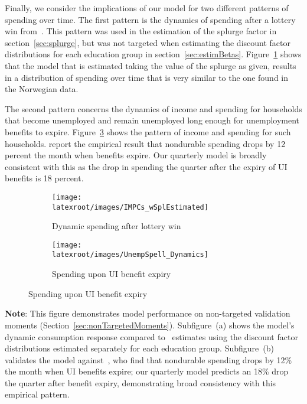 \documentclass[qe]{econsocart}
\begin{document}
Finally, we consider the implications of our model for two different patterns of spending over time.
The first pattern is the dynamics of spending after a lottery win from~\citeauthor{fagereng-mpc-2021}.
This pattern was used in the estimation of the splurge factor in section~\ref{sec:splurge}, but was not targeted when estimating the discount factor distributions for each education group in section~\ref{sec:estimBetas}.
Figure~\ref{fig:USaggmpclotterywin} shows that the model that is estimated taking the value of the splurge as given, results in a distribution of spending over time that is very similar to the one found in the Norwegian data.

\label{ganong-noel}

The second pattern concerns the dynamics of income and spending for households that become unemployed and remain unemployed long enough for unemployment benefits to expire.
Figure~\ref{fig:expiryUI} shows the pattern of income and spending for such households.
\cite{ganongConsumer2019} report the empirical result that nondurable spending drops by 12 percent the month when benefits expire.
Our quarterly model is broadly consistent with this as the drop in spending the quarter after the expiry of UI benefits is 18 percent.

\begin{figure}[H]
  \centering
  \caption{Model validation for non-targeted spending patterns}
  \label{fig:untargetedMoments} 
    \centering
    \begin{subfigure}[b]{0.48\textwidth}
      \centering
      \texttt{[image: \\latexroot/images/IMPCs\_wSplEstimated]}
      \caption{Dynamic spending after lottery win}
      \label{fig:USaggmpclotterywin} 
    \end{subfigure}
    \begin{subfigure}[b]{0.48\textwidth}
      \centering
      \texttt{[image: \\latexroot/images/UnempSpell\_Dynamics]}
      \caption{Spending upon UI benefit expiry}
      \label{fig:expiryUI} 
    \end{subfigure}
\end{figure}
\noindent\parbox{\textwidth}{\footnotesize
  \textbf{Note}: This figure demonstrates model performance on non-targeted validation moments (Section~\ref{sec:nonTargetedMoments}).
  Subfigure~(a) shows the model's dynamic consumption response compared to~\cite{fagereng-mpc-2021} estimates
  using the discount factor distributions estimated separately for each education group.
  Subfigure~(b) validates the model against~\cite{ganongConsumer2019}, who find that nondurable spending
  drops by 12\% the month when UI benefits expire; our quarterly model predicts an 18\% drop
  the quarter after benefit expiry,   demonstrating broad consistency with this empirical pattern.
}
\end{document}
